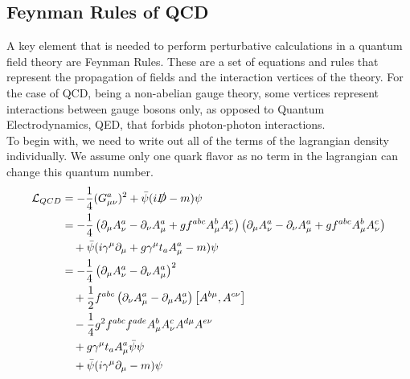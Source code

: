 \subsection{Feynman Rules of QCD}
A key element that is needed to perform perturbative calculations in a quantum field theory are Feynman Rules. These are a set of equations and rules that represent the propagation of fields and the interaction vertices of the theory. For the case of QCD, being a non-abelian gauge theory, some vertices represent interactions between gauge bosons only, as opposed to Quantum Electrodynamics, QED, that forbids photon-photon interactions. \\
To begin with, we need to write out all of the terms of the lagrangian density individually. We assume only one quark flavor as no term in the lagrangian can change this quantum number.
\begin{align}\nonumber
    \mathcal{L}_{QCD} &= -\frac{1}{4}(G_{\mu\nu}^a)^2 +\bar{\psi}(i\slashed{D} - m)\psi \\\nonumber
    &= -\frac{1}{4}\left( \partial_\mu A_\nu^a - \partial_\nu A_\mu^a + gf^{abc}A_\mu^b A_\nu^c \right) \left(\partial_\mu A_\nu^a - \partial_\nu A_\mu^a + gf^{abc}A_\mu^b A_\nu^c \right) \\\nonumber
    &~~~+ \bar{\psi}(i\gamma^\mu \partial_\mu  + g\gamma^\mu t_aA_\mu^a - m)\psi \\\nonumber
    &= -\frac{1}{4}\left(\partial_\mu A_\nu^a - \partial_\nu A_\mu^a\right)^2 \\\nonumber
    &~~~+ \frac{1}{2}f^{abc}\left(\partial_\nu A^a_\mu - \partial_\mu A^a_\nu \right)\left[ A^{b\mu}, A^{c\nu} \right] \\
    &~~~-\frac{1}{4}g^2f^{abc}f^{ade}A_\mu^bA_\nu^cA^{d\mu}A^{e\nu} \label{lagr:expanded}  \\\nonumber
    &~~~+g\gamma^\mu t_a A_\mu^a \bar{\psi}\psi \\\nonumber
    &~~~+ \bar{\psi}(i\gamma^\mu\partial_\mu - m)\psi
\end{align}

